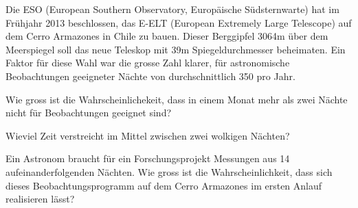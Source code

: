 Die ESO (European Southern Observatory, Europäische Südsternwarte)
hat im Frühjahr 2013 beschlossen,
das E-ELT (European Extremely Large Telescope) auf dem
Cerro Armazones in Chile zu bauen.
Dieser Berggipfel 3064m über dem Meerspiegel soll das neue Teleskop
mit 39m Spiegeldurchmesser beheimaten.
Ein Faktor für diese Wahl war die grosse Zahl klarer, für astronomische
Beobachtungen geeigneter Nächte von durchschnittlich 350 pro Jahr.
\begin{teilaufgaben}
\item Wie gross ist die Wahrscheinlichekeit,
dass in einem Monat mehr als zwei Nächte
nicht für Beobachtungen geeignet sind?
\item Wieviel Zeit verstreicht im Mittel zwischen zwei wolkigen Nächten?
\item Ein Astronom braucht für ein Forschungsprojekt Messungen aus
14 aufeinanderfolgenden Nächten. Wie gross ist die Wahrscheinlichkeit,
dass sich dieses Beobachtungsprogramm auf dem Cerro Armazones
im ersten Anlauf realisieren lässt?
\end{teilaufgaben}


